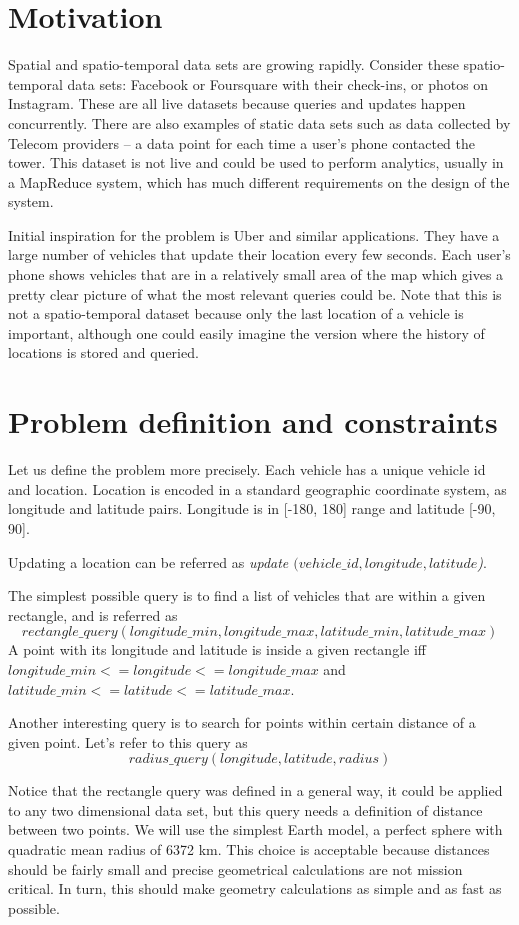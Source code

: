 \documentclass[times, utf8, diplomski]{fer}
\begin{document}
\section{Motivation}
Spatial and spatio-temporal data sets are growing rapidly. Consider these spatio-temporal data sets: Facebook or Foursquare with their check-ins, or photos on Instagram. These are all live datasets because queries and updates happen concurrently. There are also examples of static data sets such as data collected by Telecom providers -- a data point for each time a user's phone contacted the tower. This dataset is not live and could be used to perform analytics, usually in a MapReduce system, which has much different requirements on the design of the system.

Initial inspiration for the problem is Uber and similar applications. They have a large number of vehicles that update their location every few seconds. Each user's phone shows vehicles that are in a relatively small area of the map which gives a pretty clear picture of what the most relevant queries could be. Note that this is not a spatio-temporal dataset because only the last location of a vehicle is important, although one could easily imagine the version where the history of locations is stored and queried.

\section{Problem definition and constraints}
Let us define the problem more precisely. Each vehicle has a unique vehicle id and location. Location is encoded in a standard geographic coordinate system, as longitude and latitude pairs. Longitude is in [-180, 180] range and latitude [-90, 90].

Updating a location can be referred as \emph{update $(vehicle\_id, longitude, latitude$)}.

The simplest possible query is to find a list of vehicles that are within a given rectangle, and is referred as
$$rectangle\_query (longitude\_min, longitude\_max, latitude\_min, latitude\_max)$$
A point with its longitude and latitude is inside a given rectangle iff $longitude\_min <= longitude <= longitude\_max$ and $latitude\_min <= latitude <= latitude\_max$.

Another interesting query is to search for points within certain distance of a given point.  Let's refer to this query as
$$radius\_query (longitude, latitude, radius)$$

Notice that the rectangle query was defined in a general way, it could be applied to any two dimensional data set, but this query needs a definition of distance between two points. We will use the simplest Earth model, a perfect sphere with quadratic mean radius of 6372 km. This choice is acceptable because distances should be fairly small and precise geometrical calculations are not mission critical. In turn, this should make geometry calculations as simple and as fast as possible.
\end{document}
